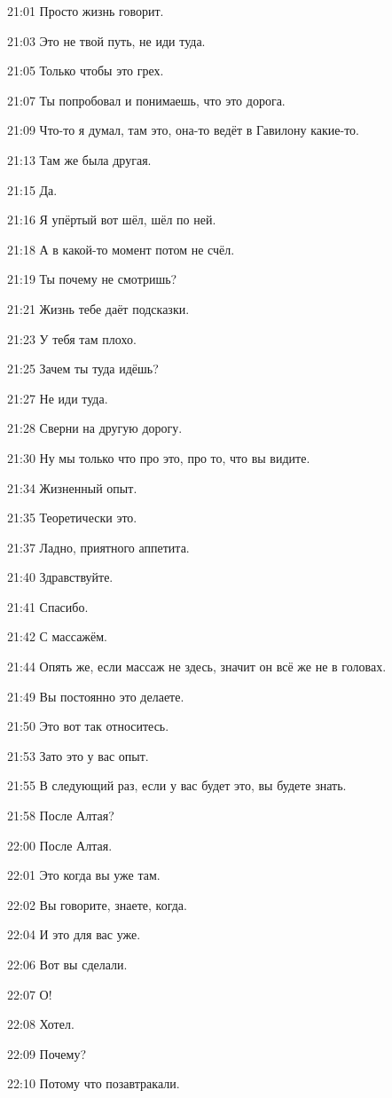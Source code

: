 21:01
Просто жизнь говорит.

21:03
Это не твой путь, не иди туда.

21:05
Только чтобы это грех.

21:07
Ты попробовал и понимаешь, что это дорога.

21:09
Что-то я думал, там это, она-то ведёт в Гавилону какие-то.

21:13
Там же была другая.

21:15
Да.

21:16
Я упёртый вот шёл, шёл по ней.

21:18
А в какой-то момент потом не счёл.

21:19
Ты почему не смотришь?

21:21
Жизнь тебе даёт подсказки.

21:23
У тебя там плохо.

21:25
Зачем ты туда идёшь?

21:27
Не иди туда.

21:28
Сверни на другую дорогу.

21:30
Ну мы только что про это, про то, что вы видите.

21:34
Жизненный опыт.

21:35
Теоретически это.

21:37
Ладно, приятного аппетита.

21:40
Здравствуйте.

21:41
Спасибо.

21:42
С массажём.

21:44
Опять же, если массаж не здесь, значит он всё же не в головах.

21:49
Вы постоянно это делаете.

21:50
Это вот так относитесь.

21:53
Зато это у вас опыт.

21:55
В следующий раз, если у вас будет это, вы будете знать.

21:58
После Алтая?

22:00
После Алтая.

22:01
Это когда вы уже там.

22:02
Вы говорите, знаете, когда.

22:04
И это для вас уже.

22:06
Вот вы сделали.

22:07
О!

22:08
Хотел.

22:09
Почему?

22:10
Потому что позавтракали.

